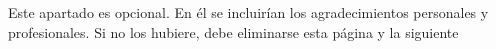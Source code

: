 
\pagestyle{fancy}


Este apartado es opcional. En él se incluirían los agradecimientos personales y profesionales. Si no los hubiere, debe eliminarse esta página y la siguiente 

\chapterend

\blankpage